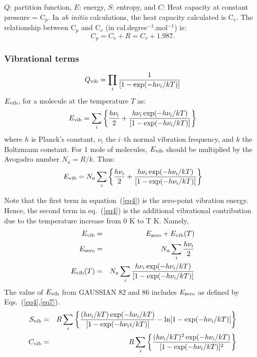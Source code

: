 $Q$: partition function, $E$: energy, $S$: entropy,
and $C$: Heat capacity at constant pressure = C$_p$. In {\em ab initio}
calculations, the heat capacity calculated is C$_v$.
The relationship between C$_p$ and C$_v$ (in cal.degree$^{-1}$.mol$^{-1}$) is:
$$
C_p=C_v+R=C_v+1.987.
$$

\subsubsection{Vibrational terms}
\begin{equation}
Q_{\rm vib} = \prod_i{\frac{1}{[1 - \exp(-h\nu_i/kT)]}} \label{eq2}
\end{equation}
$E_{\rm vib}$, for a molecule at the temperature $T$ as:
\begin{equation}
E_{\rm vib} = \sum_i\left\{\frac{h\nu_i}{2} +
\frac{h\nu_i\exp(-h\nu_i/kT)}{[1 - \exp(-h\nu_i/kT)]}\right\}  \label{eq3} \nonumber
\end{equation}
where $h$ is Planck's constant, $\nu_i$ the $i$--th normal  vibration
frequency, and $k$  the Boltzmann constant.  For 1 mole of molecules, $E_{\rm
vib}$  should be multiplied by the Avogadro number $N_a = R/k$.  Thus:
\begin{equation}
E_{\rm vib} = N_a  \sum_i\left\{ \frac{h\nu_i}{2}
 + \frac{h\nu_i\exp(-h\nu_i/kT)}{[1-\exp(-h\nu_i/kT)]}\right\}  \label{eq4}
\end{equation}

Note that the first term  in equation~(\ref{eq4})  is   the  zero-point
vibration energy.   Hence,  the second term  in eq.~(\ref{eq4}) is the
additional vibrational contribution due to the temperature increase from 0 K to
T K.  Namely,
\begin{eqnarray}
E_{\rm vib}                & = & E_{\rm zero} + E_{\rm vib}(T)
\label{eq5}\nonumber\\
E_{\rm zero}               & = & N_a \sum_i {\frac{h\nu_i}{2}} \nonumber\label{eq6}\\
E_{\rm vib}( T) & = & N_a  \sum_i
{\frac{h\nu_i\exp(-h\nu_i/kT)}{[1 - \exp(-h\nu_i/kT)]}} \label{eq7}
\end{eqnarray}
The value of $E_{\rm vib}$ from GAUSSIAN 82 and 86 includes
$E_{\rm zero}$ as defined by Eqs.~(\ref{eq4},\ref{eq7}).
\begin{eqnarray}
S_{\rm vib} & = & R \sum_i\left\{
\frac{(h\nu_i/kT)\exp(-h\nu_i/kT)}{[1 - \exp(-h\nu_ii/kT)]}
- \ln[1 - \exp(-h\nu_i/kT)]\right\} \nonumber\label{eq8}\\
C_{\rm vib} & = & R \sum_i\left\{
\frac{(h\nu_i/kT)^2 \exp(-h\nu_i/kT)}{[1 - \exp(-h\nu_i/kT)]^2}\right\}
\nonumber\label{eq9}
\end{eqnarray}

